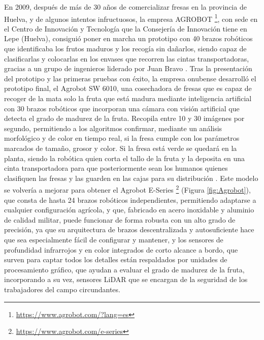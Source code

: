 En 2009, después de más de 30 años de comercializar fresas en la provincia de Huelva, y de algunos intentos infructuosos, la empresa AGROBOT \footnote{\url{https://www.agrobot.com/?lang=es}}, con sede en el Centro de Innovación y Tecnología que la Consejería de Innovación tiene en Lepe (Huelva), consiguió poner en marcha un prototipo con 40 brazos robóticos que identificaba los frutos maduros y los recogía sin dañarlos, siendo capaz de clasificarlas y colocarlas en los envases que recorren las cintas transportadoras, gracias a un grupo de ingenieros liderado por Juan Bravo \cite{Cabanillas09}. Tras la presentación del prototipo y las primeras pruebas con éxito, la empresa onubense desarrolló el prototipo final, el Agrobot SW 6010, una cosechadora de fresas que es capaz de recoger de la mata solo la fruta que está madura mediante inteligencia artificial con 30 brazos robóticos que incorporan una cámara con visión artificial que detecta el grado de madurez de la fruta. Recopila entre 10 y 30 imágenes por segundo, permitiendo a los algoritmos confirmar, mediante un análisis morfológico y de color en tiempo real, si la fresa cumple con los parámetros marcados de tamaño, grosor y color. Si la fresa está verde se quedará en la planta, siendo la robótica quien corta el tallo de la fruta y la deposita en una cinta transportadora para que posteriormente sean los humanos quienes clasifiquen las fresas y las guarden en las cajas para su distribución \cite{Maite19}. Este modelo se volvería a mejorar para obtener el Agrobot E-Series \footnote{\url{https://www.agrobot.com/e-series}} (Figura \ref{fig:Agrobot}), que consta de hasta 24 brazos robóticos independientes, permitiendo adaptarse a cualquier configuración agrícola, y que, fabricado en acero inoxidable y aluminio de calidad militar, puede funcionar de forma robusta con un alto grado de precisión, ya que su arquitectura de brazos descentralizada y autosuficiente hace que sea especialmente fácil de configurar y mantener, y los sensores de profundidad infrarrojos y en color integrados de corto alcance a bordo, que surven para captar todos los detalles están respaldados por unidades de procesamiento gráfico, que ayudan a evaluar el grado de madurez de la fruta, incorporando a su vez, sensores LiDAR que se encargan de la seguridad de los trabajadores del campo circundantes.

